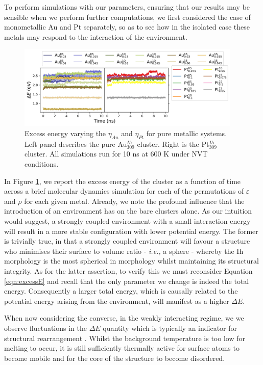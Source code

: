 To perform  simulations with our parameters, ensuring that our results may be sensible when we perform further computations, we first considered the case of monometallic Au and Pt separately, so as to see how in the isolated case these metals may respond to the interaction of the environment.

\begin{figure}[h!]
     \centering
         \includegraphics[width=0.95\textwidth]{figures/MD/Env/Env_Pure.jpeg}
    \caption{Excess energy varying the $\eta_{Au}$ and $\eta_{Pt}$ for pure metallic systems. Left panel describes the pure Au$_{309}^{Ih}$ cluster. Right is the Pt$_{309}^{Ih}$ cluster. All simulations run for 10 ns at 600 K under NVT conditions.}
    \label{fig:Pure_eta}
\end{figure}

In Figure \ref{fig:Pure_eta}, we report the excess energy of the cluster as a function of time across a brief molecular dynamics simulation for each of the permutations of $\varepsilon$ and $\rho$ for each given metal. Already, we note the profound influence that the introduction of an environment has on the bare clusters alone. As our intuition would suggest, a strongly coupled environment with a small interaction energy will result in a more stable configuration with lower potential energy. The former is trivially true, in that a strongly coupled environment will favour a structure who minimises their surface to volume ratio - \textit{i.e.,} a sphere - whereby the Ih morphology is the most spherical in morphology whilst maintaining its structural integrity. As for the latter assertion, to verify this we must reconsider Equation \ref{eqn:excessE} and recall that the only parameter we change is indeed the total energy. Consequently a larger total energy, which is causally related to the potential energy arising from the environment, will manifest as a higher $\Delta E$.

When now considering the converse, in the weakly interacting regime, we we observe fluctuations in the $\Delta E$ quantity which is typically an indicator for structural rearrangement \cite{LaiaMelt}. Whilst the background temperature is too low for melting to occur, it is still sufficiently thermally active for surface atoms to become mobile and for the core of the structure to become disordered.

